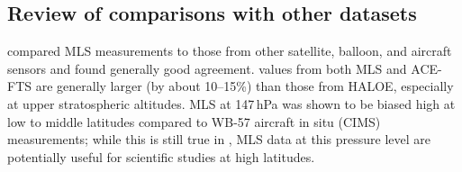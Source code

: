 \subsection{Review of comparisons with other datasets}

\citet{FroidevauxEtal:2008:HCl} compared \vii MLS  measurements to those from other satellite, balloon, and aircraft sensors and found generally good agreement.  values from both MLS and ACE-FTS are generally larger (by about 10--15\%) than those from HALOE, especially at upper stratospheric altitudes. MLS  at 147\,hPa was shown to be biased high at low to middle latitudes compared to \mbox{WB-57} aircraft in situ (CIMS) measurements; while this is still true in \thisv, MLS  data at this pressure level are potentially useful for scientific studies at high latitudes.

